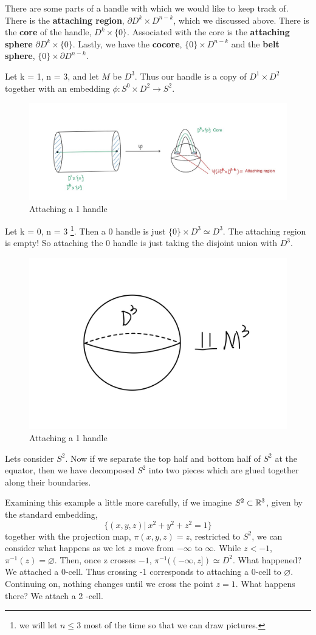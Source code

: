 There are some parts of a handle with which we would like to keep track of. There is the \textbf{attaching region}, $\partial D^{k} \times D^{n-k}$, which we discussed above. There is the \textbf{core} of the handle, $D^{k}\times \{0\}$. Associated with the core is the \textbf{attaching sphere} $\partial D^{k} \times \{0\}$. Lastly, we have the \textbf{cocore}, $\{0\}\times D^{n-k}$ and the \textbf{belt sphere}, $\{0\}\times \partial D^{n-k}$.
\begin{example} Let k = 1, n = 3, and let $M$ be $D^{3}$. Thus our handle is a copy of $D^{1}\times D^{2}$ together with an embedding $\phi: S^{0}\times D^{2} \rightarrow S^{2}$.
\begin{figure}[h]
    \centering
    \includegraphics[width = .8\linewidth]{Images_Lect1/3-dimensional_1-handle.jpeg}
    \caption{Attaching a 1 handle}
    \label{fig:1handle}
\end{figure}
\end{example}
\begin{example}
Let k = 0, n = 3 \footnote{we will let $n \leq 3$ most of the time so that we can draw pictures.}. Then a 0 handle is just $\{0 \} \times D^{3} \simeq D^{3}$. The attaching region is empty! So attaching the 0 handle is just taking the disjoint union with $D^{3}$.
\begin{figure}[h!]
    \centering
    \includegraphics[width = .3\linewidth]{Images_Lect1/0handle.jpeg}
    \caption{Attaching a 1 handle}
    \label{fig:0handle}
\end{figure}
\end{example}
\begin{example}
Lets consider $S^{2}$. Now if we separate the top half and bottom half of $S^{2}$ at the equator, then we have decomposed $S^{2}$ into two pieces which are glued together along their boundaries.

Examining this example a little more carefully, if we imagine $S^{2}\subset \mathbb{R}^{3}$, given by the standard embedding,
\[
\{(x,y,z) \big| ~ x^{2}+y^{2}+z^{2}=1\}
\]
together with the projection map, $\pi(x,y,z) = z$, restricted to $S^{2}$, we can consider what happens as we let $z$ move from $-\infty$ to $\infty$. While $z< -1$, $\pi^{-1}(z) = \varnothing$. Then, once z crosses $-1$, $\pi^{-1}((-\infty, z]) \simeq D^{2}$. What happened? We attached a 0-cell. Thus crossing -1 corresponds to attaching a 0-cell to $\varnothing$. Continuing on, nothing changes until we cross the point $z=1$. What happens there? We attach a 2 -cell. 
\end{example}

